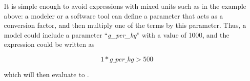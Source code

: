 It is simple enough to avoid expressions with mixed units such as
in the example above: a modeler or a software tool can define a
parameter that acts as a conversion factor, and then multiply one
of the terms by this parameter.  Thus, a model could include a
parameter ``\emph{g\_per\_kg}'' with a value of 1000, and the
expression could be written as
\begin{linenomath}
  \begin{equation*}
    1 * g\_per\_kg > 500
  \end{equation*}
\end{linenomath}
which will then evaluate to .








